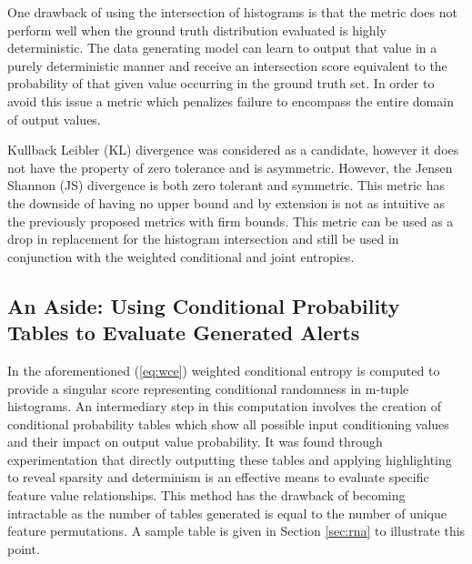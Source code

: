 One drawback of using the intersection of histograms is that the metric does not perform well when the ground truth distribution evaluated is highly deterministic. The data generating model can learn to output that value in a purely deterministic manner and receive an intersection score equivalent to the probability of that given value occurring in the ground truth set. In order to avoid this issue a metric which penalizes failure to encompass the entire domain of output values. 

Kullback Leibler (KL) divergence was considered as a candidate, however it does not have the property of zero tolerance and is asymmetric. However, the Jensen Shannon (JS) divergence is both zero tolerant and symmetric. This metric has the downside of having no upper bound and by extension is not as intuitive as the previously proposed metrics with firm bounds. This metric can be used as a drop in replacement for the histogram intersection and still be used in conjunction with the weighted conditional and joint entropies.

\subsection{An Aside: Using Conditional Probability Tables to Evaluate Generated Alerts}

In the aforementioned (\ref{eq:wce}) weighted conditional entropy is computed to provide a singular score representing conditional randomness in m-tuple histograms. An intermediary step in this computation involves the creation of conditional probability tables which show all possible input conditioning values and their impact on output value probability. It was found through experimentation that directly outputting these tables and applying highlighting to reveal sparsity and determinism is an effective means to evaluate specific feature value relationships. This method has the drawback of becoming intractable as the number of tables generated is equal to the number of unique feature permutations. A sample table is given in Section \ref{sec:rna} to illustrate this point. 
